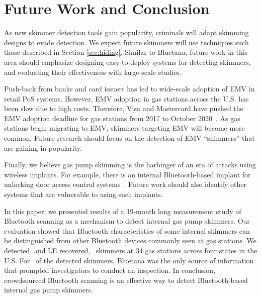 \section{Future Work and Conclusion}
\label{sec:conclusion}

As new skimmer detection tools gain popularity, criminals will adapt skimming designs to evade detection.
%
We expect future skimmers will use techniques such those described in Section \ref{sec:hiding}.
%
Similar to Bluetana, future work in this area should emphasize designing easy-to-deploy systems for detecting
skimmers, and evaluating their effectiveness with large-scale studies.

Push-back from banks and card issuers has led to wide-scale adoption of EMV in
retail PoS systems. 
%
However, EMV adoption in gas stations across the U.S. has been slow due to high
costs.
%
Therefore, Visa and Mastercard have pushed the EMV adoption deadline for gas
stations from 2017 to October 2020~\cite{emv2020}. 
%
As gas stations begin migrating to EMV, skimmers targeting EMV will become more
common. 
%
Future research should focus on the detection of EMV ``shimmers'' that are
gaining in popularity.

Finally, we believe gas pump skimming is the harbinger of an era of attacks
using wireless implants. 
%
For example, there is an internal Bluetooth-based implant for unlocking door
access control systems~\cite{blekey}. 
%
Future work should also identify other
systems that are vulnerable to using such implants.

In this paper, we presented results of a 19-month long measurement study of
Bluetooth scanning as a mechanism to detect internal gas pump skimmers. 
%
Our evaluation showed that Bluetooth characteristics of some internal skimmers
can be distinguished from other Bluetooth devices commonly seen at gas
stations. 
%
We detected, and LE recovered, \totalskimmers~skimmers at 34 gas
stations across four states in the U.S. 
%
For \totalskimmersBluetana~of the detected skimmers, Bluetana was the only
source of information that prompted investigators to conduct an inspection.
%
In conclusion, crowdsourced Bluetooth scanning is an effective way to detect
Bluetooth-based internal gas pump skimmers.

\begin{comment}
This paper presented Bluetana, a empirical measurement study of Bluetooth's ability to detect internal
card skimmers. Bluetooth makes it possible to quickly and accurately detect skimmers within gas dispensers.
Our evaluation has shown that Bluetooth is a promising method of skimmer detection, capable of
detecting ~\totalskimmers~ skimmers for a \emph{daily} monetary impact of ~\Bluetanafraudprevented~ dollars in a study of ~\visitedgasstations~ stations.
\end{comment}

